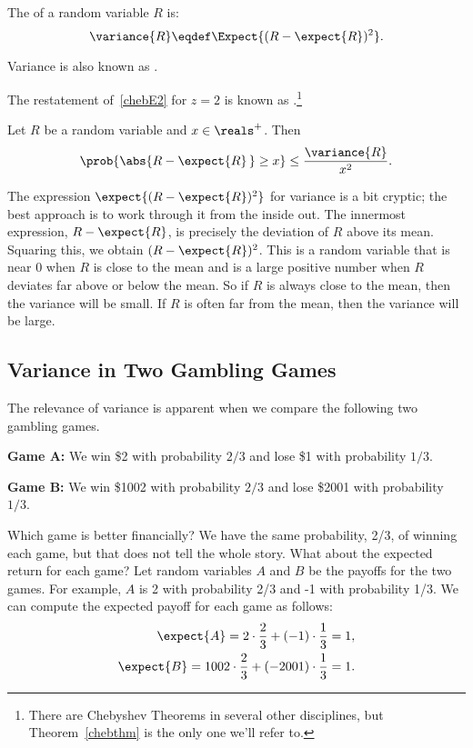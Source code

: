 \begin{definition}\label{defvar}
The  of a random variable $R$ is:
\[
\variance{R} \eqdef \Expect{(R - \expect{R})^2}.
\]
\end{definition}
Variance is also known as .

The restatement of~\eqref{chebE2} for $z=2$ is known as
.\footnote{There are Chebyshev Theorems in
  several other disciplines, but Theorem~\ref{chebthm} is the only one
  we'll refer to.}
\begin{theorem}[Chebyshev]\label{chebthm}
  Let $R$ be a random variable and $x \in \reals^+$.  Then
\[
\prob{\abs{R - \expect{R}\, } \geq x} \leq \frac{\variance{R}}{x^2}.
\]
\end{theorem}

The expression $\expect{(R - \expect{R})^2}$ for variance is a bit
cryptic; the best approach is to work through it from the inside out.  The
innermost expression, $R - \expect{R}$, is precisely the deviation of $R$
above its mean.  Squaring this, we obtain $(R - \expect{R})^2$.  This is
a random variable that is near 0 when $R$ is close to the mean and is a
large positive number when $R$ deviates far above or below the mean.  So
if $R$ is always close to the mean, then the variance will be small.  If
$R$ is often far from the mean, then the variance will be large.

\subsection{Variance in Two Gambling Games}

The relevance of variance is apparent when we compare the following
two gambling games.

\textbf{Game A:} We win \$2 with probability $2/3$ and lose \$1 with probability
$1/3$.

\textbf{Game B:} We win \$1002 with probability $2/3$ and lose \$2001 with
probability $1/3$.

Which game is better financially?  We have the same probability, 2/3,
of winning each game, but that does not tell the whole story.  What about
the expected return for each game?  Let random variables $A$ and $B$ be
the payoffs for the two games.  For example, $A$ is 2 with probability
2/3 and -1 with probability 1/3.  We can compute the
expected payoff for each game as follows:
\begin{eqnarray*}
\expect{A} = 2 \cdot \frac{2}{3} + (-1) \cdot \frac{1}{3} = 1, \\
\expect{B} = 1002 \cdot \frac{2}{3} + (-2001) \cdot \frac{1}{3} = 1.
\end{eqnarray*}

